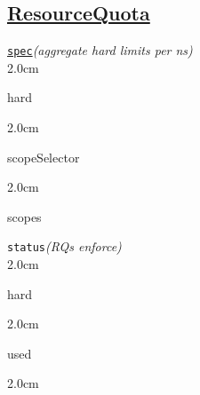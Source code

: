 \subsection*{\href{https://kubernetes.io/docs/concepts/policy/resource-quotas/}{ResourceQuota}}

\texttt{\href{https://kubernetes.io/docs/reference/kubernetes-api/policy-resources/resource-quota-v1/}{spec}}\quad\textit{(aggregate hard limits per ns)}\\[-2mm]
\api
{2.0cm}{
hard

}
{2.0cm}{
scopeSelector

}
{2.0cm}{
scopes

}
\stopapi


\texttt{status}\quad\textit{(RQs enforce)}\\[-2mm]
\api
{2.0cm}{
hard

}
{2.0cm}{
used

}
{2.0cm}{

}
\stopapi








\begin{comment}

\texttt{spec}\quad\textit{()}\\[-2mm]
\api
{2.0cm}{

}
{2.0cm}{

}
{2.0cm}{

}
\stopapi


\texttt{status}\quad\textit{()}\\[-2mm]
\api
{2.0cm}{

}
{2.0cm}{

}
{2.0cm}{

}
\stopapi



\end{comment}